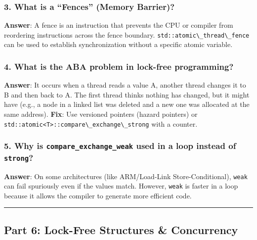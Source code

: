 \hypertarget{what-is-a-fences-memory-barrier}{%
\subsubsection{3. What is a ``Fences'' (Memory
Barrier)?}\label{what-is-a-fences-memory-barrier}}

\textbf{Answer}: A fence is an instruction that prevents the CPU or
compiler from reordering instructions across the fence boundary.
\passthrough{\lstinline!std::atomic\_thread\_fence!} can be used to
establish synchronization without a specific atomic variable.

\hypertarget{what-is-the-aba-problem-in-lock-free-programming}{%
\subsubsection{4. What is the ABA problem in lock-free
programming?}\label{what-is-the-aba-problem-in-lock-free-programming}}

\textbf{Answer}: It occurs when a thread reads a value A, another thread
changes it to B and then back to A. The first thread thinks nothing has
changed, but it might have (e.g., a node in a linked list was deleted
and a new one was allocated at the same address). \textbf{Fix}: Use
versioned pointers (hazard pointers) or
\passthrough{\lstinline!std::atomic<T>::compare\_exchange\_strong!} with
a counter.

\hypertarget{why-is-compare_exchange_weak-used-in-a-loop-instead-of-strong}{%
\subsubsection{\texorpdfstring{5. Why is
\texttt{compare\_exchange\_weak} used in a loop instead of
\texttt{strong}?}{5. Why is compare\_exchange\_weak used in a loop instead of strong?}}\label{why-is-compare_exchange_weak-used-in-a-loop-instead-of-strong}}

\textbf{Answer}: On some architectures (like ARM/Load-Link
Store-Conditional), \passthrough{\lstinline!weak!} can fail spuriously
even if the values match. However, \passthrough{\lstinline!weak!} is
faster in a loop because it allows the compiler to generate more
efficient code.

\begin{center}\rule{0.5\linewidth}{0.5pt}\end{center}

\hypertarget{part-6-lock-free-structures-concurrency}{%
\subsection{Part 6: Lock-Free Structures \&
Concurrency}\label{part-6-lock-free-structures-concurrency}}

